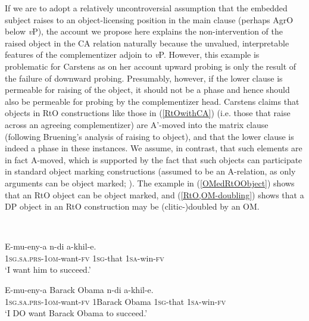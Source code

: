\documentclass[output=paper
,modfonts
,nonflat
]{langsci/langscibook}
\begin{document}
If we are to adopt a relatively uncontroversial assumption that the embedded subject raises to an object-licensing position in the main clause (perhaps AgrO below \textit{v}P), the account we propose here explains the non-intervention of the raised object in the CA relation naturally because the unvalued, interpretable features of the complementizer adjoin to \textit{v}P. However, this example is problematic for Carstens as on her account upward probing is only the result of the failure of downward probing. Presumably, however, if the lower clause is permeable for raising of the object, it should not be a phase and hence should also be permeable for probing by the complementizer head. Carstens claims that objects in RtO constructions like those in (\ref{RtOwithCA}) (i.e. those that raise across an agreeing complementizer) are A’-moved into the matrix clause (following Bruening's \citeyear{Bruening:2001d} analysis of raising to object), and that the lower clause is indeed a phase in these instances. We assume, in contrast, that such elements are in fact A-moved, which is supported by the fact that such objects can participate in standard object marking constructions (assumed to be an A-relation, as only arguments can be object marked; \citealt{Diercks:2011,SikukuEt:2017}). The example in (\ref{OMedRtOObject}) shows that an RtO object can be object marked, and (\ref{RtO,OM-doubling}) shows that a DP object in an RtO construction may be (clitic-)doubled by an OM.%

\ea
{} \\

\begin{xlist}

\ex \label{OMedRtOObject}
\gll E-mu-eny-a n-di a-khil-e. \\
1\textsc{sg}.\textsc{sa}.\textsc{prs}-1\textsc{om}-want-\textsc{fv} 1\textsc{sg}-that 1\textsc{sa}-win-\textsc{fv}\\
\glt `I want him to succeed.'

\ex \label{RtO,OM-doubling}
\gll E-mu-eny-a Barack Obama n-di a-khil-e.\\
1\textsc{sg}.\textsc{sa}.\textsc{prs}-1\textsc{om}-want-\textsc{fv} 1Barack Obama 1\textsc{sg}-that 1\textsc{sa}-win-\textsc{fv} \\
\glt `I DO want Barack Obama to succeed.'

\end{xlist}
\z
\end{document}

